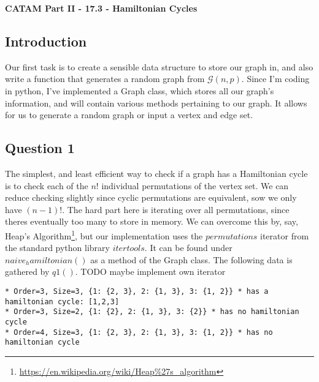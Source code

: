 \documentclass[10pt,a4paper]{report}
\begin{document}
\textbf{CATAM Part II - 17.3 - Hamiltonian Cycles}
\thispagestyle{empty}

\newpage

\subsection*{Introduction}

Our first task is to create a sensible data structure to store our graph in, and also write a function that generates a random graph from $\mathcal{G}(n,p)$. Since I'm coding in python, I've implemented a Graph class, which stores all our graph's information, and will contain various methods pertaining to our graph. It allows for us to generate a random graph or input a vertex and edge set.

\subsection*{Question 1}	

The simplest, and least efficient way to check if a graph has a Hamiltonian cycle is to check each of the $n!$ individual permutations of the vertex set. We can reduce checking slightly since cyclic permutations are equivalent, sow we only have $(n-1)!$. The hard part here is iterating over all permutations, since theres eventually too many to store in memory. We can overcome this by, say, Heap's Algorithm\footnote{\url{https://en.wikipedia.org/wiki/Heap\%27s_algorithm}}, but our implementation uses the $permutations$ iterator from the standard python library $itertools$.  It can be found under $naive_hamiltonian()$ as a method of the Graph class. The following data is gathered by $q1()$. TODO maybe implement own iterator

\begin{lstlisting}[breaklines]
* Order=3, Size=3, {1: {2, 3}, 2: {1, 3}, 3: {1, 2}} * has a hamiltonian cycle: [1,2,3] 
* Order=3, Size=2, {1: {2}, 2: {1, 3}, 3: {2}} * has no hamiltonian cycle
* Order=4, Size=3, {1: {2, 3}, 2: {1, 3}, 3: {1, 2}} * has no hamiltonian cycle
\end{lstlisting}
\end{document}
